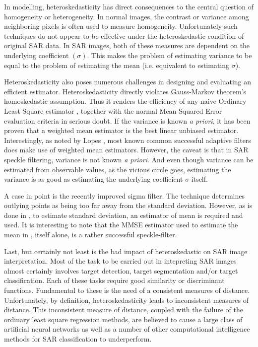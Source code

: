 \documentclass[journal]{IEEEtran}
\begin{document}
In modelling, heteroskedasticity has direct consequences to the central question of homogeneity or heterogeneity. 
In normal images, the contrast or variance among neighboring pixels is often used to measure homogeneity. 
Unfortunately such techniques do not appear to be effective under the heteroskedastic condition of original SAR data. 
In SAR images, both of these measures are dependent on the underlying coefficient $(\sigma)$. 
This makes the problem of estimating variance to be equal to the problem of estimating the mean (i.e. equivalent 
to estimating $\sigma$).

Heteroskedasticity also poses numerous challenges in designing and evaluating an efficient estimator. 
Heteroskedasticity directly violates Gauss-Markov theorem's homoskedastic assumption. 
Thus it renders the efficiency of any naive Ordinary Least Square estimator \cite{Furno_1991_JStatCompSimul}, 
together with the normal Mean Squared Error evaluation criteria in serious doubt. 
If the variance is known \textit{a priori}, it has been proven that a weighted mean estimator is the 
best linear unbiased estimator. 
Interestingly, as noted by Lopes \cite{Lopes_TGRS_1990}, most known common successful adaptive 
filters \cite{Lee_PAMI_1980} \cite{Kuan_1985_PAMI} \cite{Frost_PAMI_1982} does make use of weighted mean estimators. 
However, the caveat is that in SAR speckle filtering, variance is not known \textit{a priori}. 
And even though variance can be estimated from observable values, as the vicious circle goes, 
estimating the variance is as good as estimating the underlying coefficient $\sigma$ itself.

A case in point is the recently improved sigma filter\cite{Lee_TGRS_2009}. 
The technique determines outlying points as being too far away from the standard deviation. 
However, as is done in \cite{Lee_TGRS_2009}, to estimate standard deviation, an estimator of mean is required 
and used. It is interesting to note that the MMSE estimator used to estimate the mean 
in \cite{Lee_TGRS_2009}, itself alone, is a rather successful speckle-filter\cite{Lee_PAMI_1980}.

Last, but certainly not least is the bad impact of heteroskedastic on SAR image interpretation. 
Most of the task to be carried out in intepreting SAR images almost certainly involves target detection, 
target segmentation and/or target classification. 
Each of these tasks require good similarity or discriminant functions. 
Fundamental to these is the need of a consistent measures of distance. 
Unfortunately, by definition, heteroskedasticity leads to inconsistent measures of distance. 
This inconsistent measure of distance, coupled with the failure of the ordinary least square regression methods, are
 believed to cause a large class of artificial neural networks as well as a number of other computational 
 intelligence methods for SAR classification to underperform.
\end{document}

